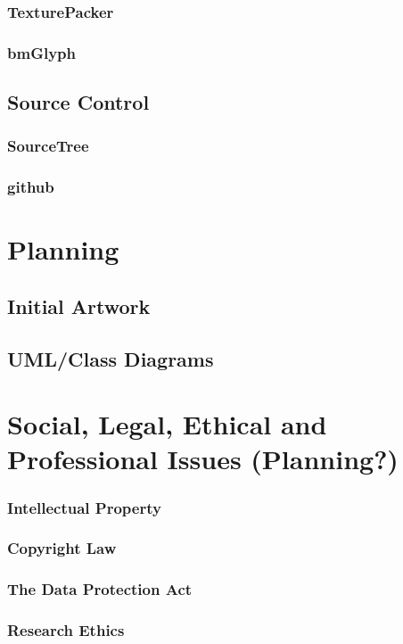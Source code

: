 \documentclass[runningheads,a4paper]{llncs}
\begin{document}
		\subsubsection{TexturePacker}
		\subsubsection{bmGlyph}
	\subsection{Source Control}
		\subsubsection{SourceTree}
		\subsubsection{github}

\section{Planning}
	\subsection{Initial Artwork}
	\subsection{UML/Class Diagrams}
	
\section{Social, Legal, Ethical and Professional Issues (Planning?)}
		\subsubsection{Intellectual Property}
		\subsubsection{Copyright Law}
		\subsubsection{The Data Protection Act}
		\subsubsection{Research Ethics}
\end{document}
